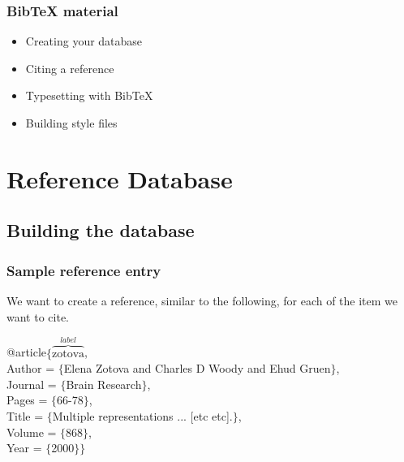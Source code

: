 \begin{frame}  \frametitle{BibTeX material}
	\begin{itemize}
		\item Creating your database
		\item Citing a reference
		\item Typesetting with BibTeX
		\item Building style files
	\end{itemize}
\end{frame}

\section[Reference Database]{Reference Database}
\subsection[Building the database]{Building the database}

\begin{frame}  \frametitle{Sample reference entry}
	We want to create a reference, similar to the following, for each of the item we want to cite.
	
	\vspace{7mm}
	
	@article$\{\overbrace{\text{zotova}}^{label}$, \\
	\hspace{3mm}	Author = $\{$Elena Zotova and Charles D Woody and Ehud Gruen$\}$, \\
	\hspace{3mm}	Journal = $\{$Brain Research$\}$, \\
	\hspace{3mm}	Pages = $\{$66-78$\}$, \\
	\hspace{3mm}	Title = $\{$Multiple representations ... [etc etc].$\}$, \\
	\hspace{3mm}	Volume = $\{$868$\}$, \\
	\hspace{3mm}	Year = $\{$2000$\}\}$ \\
\end{frame}

